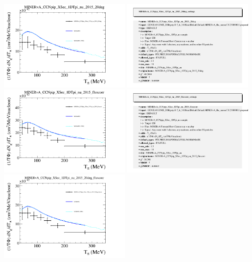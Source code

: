 \documentclass{article}
\begin{document}
\centering
\includegraphics[width=0.49\textwidth]{figures/nuisance_MINERvA_CCNpip_XSec_1DTpi_nu_2015_20deg_comp.png}
\includegraphics[width=0.49\textwidth]{figures/nuisance_MINERvA_CCNpip_XSec_1DTpi_nu_2015_20deg_info.png}
\centering
\includegraphics[width=0.49\textwidth]{figures/nuisance_MINERvA_CCNpip_XSec_1DTpi_nu_2015_fluxcorr_comp.png}
\includegraphics[width=0.49\textwidth]{figures/nuisance_MINERvA_CCNpip_XSec_1DTpi_nu_2015_fluxcorr_info.png}
\centering
\includegraphics[width=0.49\textwidth]{figures/nuisance_MINERvA_CCNpip_XSec_1DTpi_nu_2015_20deg_fluxcorr_comp.png}
\end{document}
